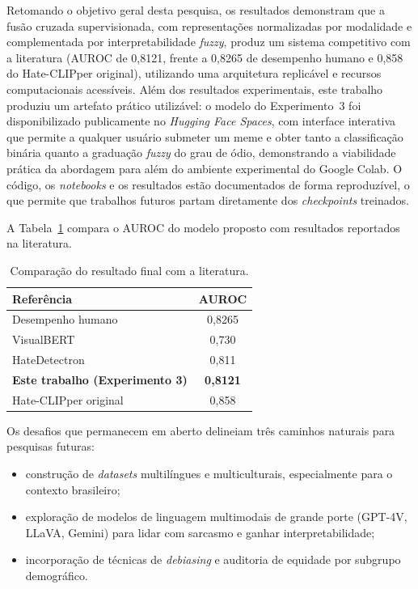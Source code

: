 Retomando o objetivo geral desta pesquisa, os resultados demonstram que a fusão cruzada supervisionada, com representações normalizadas por modalidade e complementada por interpretabilidade \textit{fuzzy}, produz um sistema competitivo com a literatura (AUROC de 0,8121, frente a 0,8265 de desempenho humano e 0,858 do Hate-CLIPper original), utilizando uma arquitetura replicável e recursos computacionais acessíveis. Além dos resultados experimentais, este trabalho produziu um artefato prático utilizável: o modelo do Experimento~3 foi disponibilizado publicamente no \textit{Hugging Face Spaces}, com interface interativa que permite a qualquer usuário submeter um meme e obter tanto a classificação binária quanto a graduação \textit{fuzzy} do grau de ódio, demonstrando a viabilidade prática da abordagem para além do ambiente experimental do Google Colab. O código, os \textit{notebooks} e os resultados estão documentados de forma reproduzível, o que permite que trabalhos futuros partam diretamente dos \textit{checkpoints} treinados.

A Tabela~\ref{tab:comparacao-literatura} compara o AUROC do modelo proposto com resultados reportados na literatura.

\begin{table}[htbp]
\centering
\caption{Comparação do resultado final com a literatura.}
\label{tab:comparacao-literatura}
\begin{tabular}{lc}
\hline
\textbf{Referência} & \textbf{AUROC} \\
\hline
Desempenho humano \cite{metaai2020} & 0,8265 \\
VisualBERT \cite{ArticleHatefulMemesChallenge2020} & 0,730 \\
HateDetectron \cite{velioglu2020} & 0,811 \\
\textbf{Este trabalho (Experimento 3)} & \textbf{0,8121} \\
Hate-CLIPper original \cite{kumar2022} & 0,858 \\
\hline
\end{tabular}
\end{table}

Os desafios que permanecem em aberto delineiam três caminhos naturais para pesquisas futuras:

\begin{itemize}
    \item construção de \textit{datasets} multilíngues e multiculturais, especialmente para o contexto brasileiro;
    \item exploração de modelos de linguagem multimodais de grande porte (GPT-4V, LLaVA, Gemini) para lidar com sarcasmo e ganhar interpretabilidade;
    \item incorporação de técnicas de \textit{debiasing} e auditoria de equidade por subgrupo demográfico.
\end{itemize}

